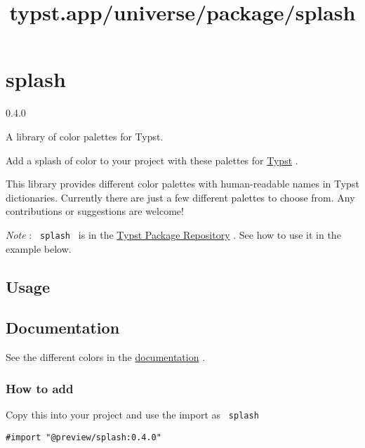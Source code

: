 \title{typst.app/universe/package/splash}

\label{banner}
\section{splash}\label{splash}

{ 0.4.0 }

A library of color palettes for Typst.

\label{readme}
Add a splash of color to your project with these palettes for
\href{https://github.com/typst/typst}{Typst} .

This library provides different color palettes with human-readable names
in Typst dictionaries. Currently there are just a few different palettes
to choose from. Any contributions or suggestions are welcome!

\emph{Note} : \texttt{\ splash\ } is in the
\href{https://github.com/typst/packages}{Typst Package Repository} . See
how to use it in the example below.

\subsection{Usage}\label{usage}

\begin{Shaded}
\begin{Highlighting}[]

\end{Highlighting}
\end{Shaded}

\subsection{Documentation}\label{documentation}

See the different colors in the
\href{https://github.com/kaarmu/splash/blob/v0.4.0/doc/main.pdf}{documentation}
.

\subsubsection{How to add}\label{how-to-add}

Copy this into your project and use the import as \texttt{\ splash\ }

\begin{verbatim}
#import "@preview/splash:0.4.0"
\end{verbatim}

